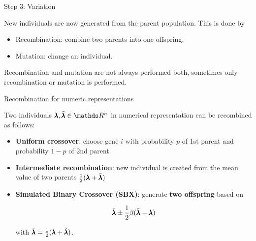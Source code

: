 \begin{frame}{Step 3: Variation}

New individuals are now generated from the parent population. This is done by

\begin{itemize}
\item Recombination: combine two parents into one offspring.
\item Mutation: change an individual.
\end{itemize}

Recombination and mutation are not always performed both, sometimes only recombination or mutation is performed.

\end{frame}

\begin{frame}{Recombination for numeric representations}

Two individuals $\xx, \tilde\xx \in \R^n$ in numerical representation can be recombined as follows:

\begin{itemize}
\item \textbf{Uniform crossover}: choose gene $i$ with probability $p$ of 1st parent and probability $1-p$ of 2nd parent.
\item \textbf{Intermediate recombination}: new individual is created from the mean value of two parents $\frac{1}{2}(\pmb{\lambda} + \tilde{\pmb{\lambda}})$
\item \textbf{Simulated Binary Crossover (SBX)}: generate \textbf{two offspring} based on

$$
\bar{\pmb{\lambda}} \pm \frac{1}{2} \beta (\tilde{\pmb{\lambda}} - \pmb{\lambda})
$$

with $\bar{\pmb{\lambda}} = \frac{1}{2} (\pmb{\lambda} + \tilde{\pmb{\lambda}})$.
\end{itemize}

\end{frame}

